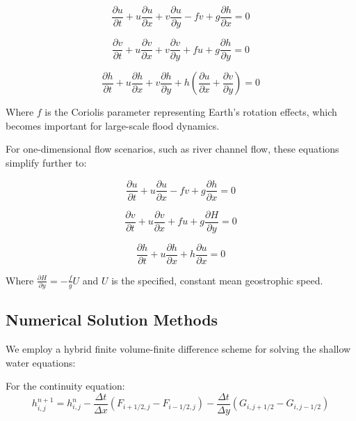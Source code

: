 \documentclass{article}
\begin{document}
\begin{equation}
\frac{\partial u}{\partial t} + u\frac{\partial u}{\partial x} + v\frac{\partial u}{\partial y} - fv + g\frac{\partial h}{\partial x} = 0
\end{equation}

\begin{equation}
\frac{\partial v}{\partial t} + u\frac{\partial v}{\partial x} + v\frac{\partial v}{\partial y} + fu + g\frac{\partial h}{\partial y} = 0
\end{equation}

\begin{equation}
\frac{\partial h}{\partial t} + u\frac{\partial h}{\partial x} + v\frac{\partial h}{\partial y} + h\left(\frac{\partial u}{\partial x} + \frac{\partial v}{\partial y}\right) = 0
\end{equation}

Where $f$ is the Coriolis parameter representing Earth's rotation effects, which becomes important for large-scale flood dynamics.

For one-dimensional flow scenarios, such as river channel flow, these equations simplify further to:

\begin{equation}
\frac{\partial u}{\partial t} + u\frac{\partial u}{\partial x} - fv + g\frac{\partial h}{\partial x} = 0
\end{equation}

\begin{equation}
\frac{\partial v}{\partial t} + u\frac{\partial v}{\partial x} + fu + g\frac{\partial H}{\partial y} = 0
\end{equation}

\begin{equation}
\frac{\partial h}{\partial t} + u\frac{\partial h}{\partial x} + h\frac{\partial u}{\partial x} = 0
\end{equation}

Where $\frac{\partial H}{\partial y} = -\frac{f}{g}U$ and $U$ is the specified, constant mean geostrophic speed.

\subsection{Numerical Solution Methods}
We employ a hybrid finite volume-finite difference scheme for solving the shallow water equations:

For the continuity equation:
\begin{equation}
h_{i,j}^{n+1} = h_{i,j}^n - \frac{\Delta t}{\Delta x}(F_{i+1/2,j} - F_{i-1/2,j}) - \frac{\Delta t}{\Delta y}(G_{i,j+1/2} - G_{i,j-1/2})
\end{equation}
\end{document}
